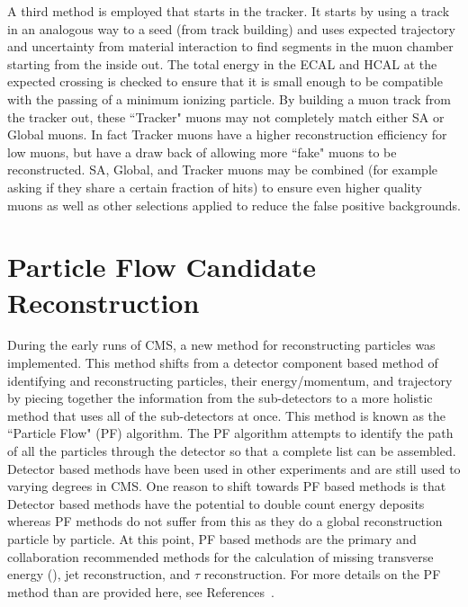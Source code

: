 	A third method is employed that starts in the tracker. It starts by using a track in an analogous way to a seed (from track building) and uses expected trajectory and uncertainty from material interaction to find segments in the muon chamber starting from the inside out. The total energy in the ECAL and HCAL at the expected crossing is checked to ensure that it is small enough to be compatible with the passing of a minimum ionizing particle. By building a muon track from the tracker out, these ``Tracker" muons may not completely match either SA or Global muons. In fact Tracker muons have a higher reconstruction efficiency for low \pt muons, but have a draw back of allowing more ``fake" muons to be reconstructed.  SA, Global, and Tracker muons may be combined (for example asking if they share a certain fraction of hits) to ensure even higher quality muons as well as other selections applied to reduce the false positive backgrounds.\\
	
	
	
	
	
	
	
	\section{Particle Flow Candidate Reconstruction}
	\label{sec:pf_algorithm}
	
	During the early runs of CMS, a new method for reconstructing particles was implemented. This method shifts from a detector component based method of identifying and reconstructing particles, their energy/momentum, and trajectory by piecing together the information from the sub-detectors to a more holistic method that uses all of the sub-detectors at once. This method is known as the ``Particle Flow" (PF) algorithm. The PF algorithm attempts to identify the path of all the particles through the detector so that a complete list can be assembled.\\
	
	Detector based methods have been used in other experiments and are still used to varying degrees in CMS. One reason to shift towards PF based methods is that Detector based methods have the potential to double count energy deposits whereas PF methods do not suffer from this as they do a global reconstruction particle by particle. At this point, PF based methods are the primary and collaboration recommended methods for the calculation of missing transverse energy (\met), jet reconstruction, and 
$\tau$ reconstruction. For more details on the PF method than are provided here, see References~\cite{pfReco,pfComm}.\\

